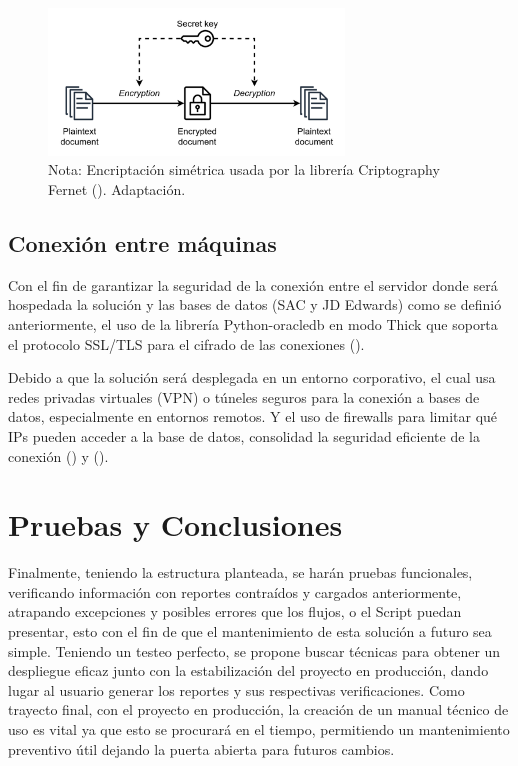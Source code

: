 \documentclass[letter,oneside,12pt,spanish]{report}
\begin{document}
\begin{figure}[ht]
    \centering
    \includegraphics[width=0.7\textwidth]{Figs/encriptacion simetrica.png}
    \label{fig:fernet}
    \\Nota:   Encriptación simétrica usada por la librería Criptography Fernet (\cite{cryptography2024fernet}). Adaptación.
\end{figure}


\subsection{Conexión entre máquinas}

\noindent Con el fin de garantizar la seguridad de la conexión entre el servidor donde será hospedada la solución y las bases de datos (SAC y JD Edwards) como se definió anteriormente, el uso de la librería Python-oracledb en modo Thick que soporta el protocolo SSL/TLS para el cifrado de las conexiones (\cite{microsoft2024keyvault}).

\noindent Debido a que la solución será desplegada en un entorno corporativo, el cual usa redes privadas virtuales (VPN) o túneles seguros para la conexión a bases de datos, especialmente en entornos remotos. Y el uso de firewalls para limitar qué IPs pueden acceder a la base de datos, consolidad la seguridad eficiente de la conexión (\cite{owasp2024cryptographic}) y (\cite{realpython2024secrets}).



\section{Pruebas y Conclusiones}

\noindent Finalmente, teniendo la estructura planteada, se harán pruebas funcionales, verificando información con reportes contraídos y cargados anteriormente, atrapando excepciones y posibles errores que los flujos, o el Script puedan presentar, esto con el fin de que el mantenimiento de esta solución a futuro sea simple. Teniendo un testeo perfecto, se propone buscar técnicas para obtener un despliegue eficaz junto con la estabilización del proyecto en producción, dando lugar al usuario generar los reportes y sus respectivas verificaciones. Como trayecto final, con el proyecto en producción, la creación de un manual técnico de uso es vital ya que esto se procurará en el tiempo, permitiendo un mantenimiento preventivo útil dejando la puerta abierta para futuros cambios.
\end{document}
